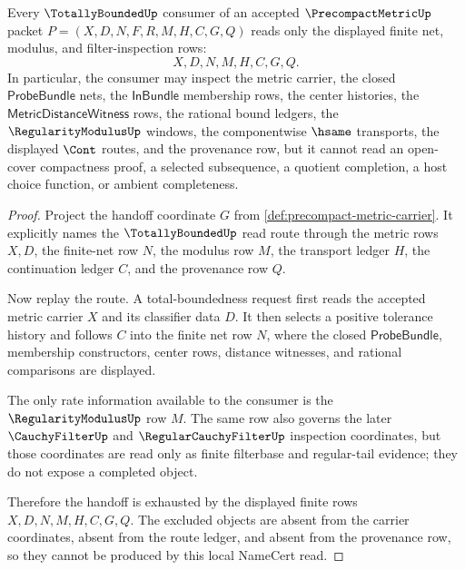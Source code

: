 \begin{theorem}
\label{thm:precompact-metric-totally-bounded-handoff}
Every $\TotallyBoundedUp$ consumer of an accepted $\PrecompactMetricUp$ packet
$P=(X,D,N,F,R,M,H,C,G,Q)$ reads only the displayed finite net, modulus, and
filter-inspection rows:
$$
X,D,N,M,H,C,G,Q .
$$
In particular, the consumer may inspect the metric carrier, the closed
$\mathsf{ProbeBundle}$ nets, the $\mathsf{InBundle}$ membership rows, the
center histories, the $\mathsf{MetricDistanceWitness}$ rows, the rational
bound ledgers, the $\RegularityModulusUp$ windows, the componentwise $\hsame$
transports, the displayed $\Cont$ routes, and the provenance row, but it
cannot read an open-cover compactness proof, a selected subsequence, a
quotient completion, a host choice function, or ambient completeness.
\end{theorem}
\begin{proof}
Project the handoff coordinate $G$ from
\autoref{def:precompact-metric-carrier}. It explicitly names the
$\TotallyBoundedUp$ read route through the metric rows $X,D$, the finite-net
row $N$, the modulus row $M$, the transport ledger $H$, the continuation
ledger $C$, and the provenance row $Q$.

Now replay the route. A total-boundedness request first reads the accepted
metric carrier $X$ and its classifier data $D$. It then selects a positive
tolerance history and follows $C$ into the finite net row $N$, where the
closed $\mathsf{ProbeBundle}$, membership constructors, center rows, distance
witnesses, and rational comparisons are displayed.

The only rate information available to the consumer is the
$\RegularityModulusUp$ row $M$. The same row also governs the later
$\CauchyFilterUp$ and $\RegularCauchyFilterUp$ inspection coordinates, but
those coordinates are read only as finite filterbase and regular-tail
evidence; they do not expose a completed object.

Therefore the handoff is exhausted by the displayed finite rows
$X,D,N,M,H,C,G,Q$. The excluded objects are absent from the carrier
coordinates, absent from the route ledger, and absent from the provenance row,
so they cannot be produced by this local NameCert read.
\end{proof}

